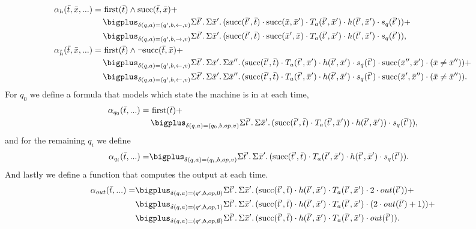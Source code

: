 \begin{align*}
\alpha_{h}(\bar{t},\bar{x},...) = \,& \first(\bar{t}) \wedge \successor(\bar{t},\bar{x}) + \\
&\bigplus_{\delta(q,a) = (q',b,\leftarrow,v)}\sa{\bar{t}'}\sa{\bar{x}'}(\successor(\bar{t}',\bar{t}) \mult \successor(\bar{x},\bar{x}')\mult T_a(\bar{t}',\bar{x}') \mult h(\bar{t}',\bar{x}') \mult s_{q}(\bar{t}')) + \\
&\bigplus_{\delta(q,a) = (q',b,\rightarrow,v)}\sa{\bar{t}'}\sa{\bar{x}'}(\successor(\bar{t}',\bar{t}) \mult \successor(\bar{x}',\bar{x})\mult T_a(\bar{t}',\bar{x}') \mult h(\bar{t}',\bar{x}') \mult s_{q}(\bar{t}')),\\
\alpha_{\hat{h}}(\bar{t},\bar{x},...) = \,& \first(\bar{t}) \wedge \neg\successor(\bar{t},\bar{x}) + \\
&\bigplus_{\delta(q,a) = (q',b,\leftarrow,v)}\sa{\bar{t}'}\sa{\bar{x}'}\sa{\bar{x}''}(\successor(\bar{t}',\bar{t}) \mult T_a(\bar{t}',\bar{x}')  \mult h(\bar{t}',\bar{x}') \mult s_{q}(\bar{t}') \mult \successor(\bar{x}'',\bar{x}') \mult (\bar{x} \neq \bar{x}'')) + \\
&\bigplus_{\delta(q,a) = (q',b,\leftarrow,v)}\sa{\bar{t}'}\sa{\bar{x}'}\sa{\bar{x}''}(\successor(\bar{t}',\bar{t}) \mult T_a(\bar{t}',\bar{x}')  \mult h(\bar{t}',\bar{x}') \mult s_{q}(\bar{t}') \mult \successor(\bar{x}',\bar{x}'') \mult (\bar{x} \neq \bar{x}'')).
\end{align*}
For $q_0$ we define a formula that models which state the machine is in at each time,
\begin{align*}
\alpha_{q_0}(\bar{t},...) = \,& \first(\bar{t}) + \\
&\bigplus_{\delta(q,a) = (q_0,b,op,v)}\sa{\bar{t}'}\sa{\bar{x}'}(\successor(\bar{t}',\bar{t}) \mult T_a(\bar{t}',\bar{x}')) \mult h(\bar{t}',\bar{x}')) \mult s_{q}(\bar{t}')),
\end{align*}
and for the remaining $q_i$ we define
\begin{align*}
\alpha_{q_i}(\bar{t},...) = &\bigplus_{\delta(q,a) = (q_i,b,op,v)}\sa{\bar{t}'}\sa{\bar{x}'}(\successor(\bar{t}',\bar{t}) \mult T_a(\bar{t}',\bar{x}') \mult h(\bar{t}',\bar{x}') \mult s_{q}(\bar{t}')).
\end{align*}
And lastly we define a function that computes the output at each time.
\begin{align*}
\alpha_{out}(\bar{t},...) = &\bigplus_{\delta(q,a) = (q',b,op,0)}\sa{\bar{t}'}\sa{\bar{x}'}(\successor(\bar{t}',\bar{t}) \mult h(\bar{t}',\bar{x}') \mult T_a(\bar{t}',\bar{x}') \mult 2\mult out(\bar{t}')) + \\
&\bigplus_{\delta(q,a) = (q',b,op,1)}\sa{\bar{t}'}\sa{\bar{x}'}(\successor(\bar{t}',\bar{t}) \mult h(\bar{t}',\bar{x}') \mult T_a(\bar{t}',\bar{x}') \mult (2\mult out(\bar{t}')+1)) + \\ 
&\bigplus_{\delta(q,a) = (q',b,op,\emptyset)}\sa{\bar{t}'}\sa{\bar{x}'}(\successor(\bar{t}',\bar{t}) \mult h(\bar{t}',\bar{x}') \mult T_a(\bar{t}',\bar{x}') \mult out(\bar{t}')).
\end{align*}
